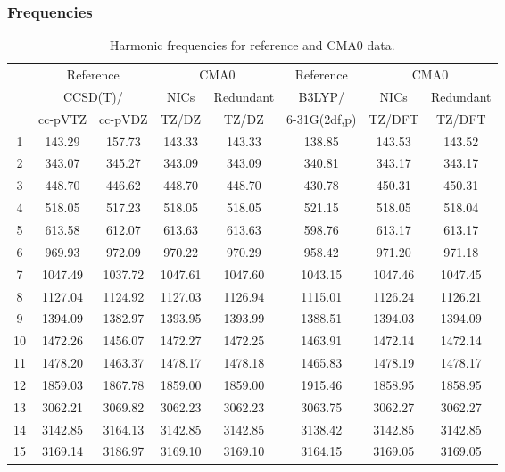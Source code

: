 \documentclass[10pt,oneside]{article}
\begin{document}
\begin{table}[h!]
\subsubsection*{Frequencies}
\centering
\caption{Harmonic frequencies for reference and CMA0 data.}
\begin{tabular}{cccccccc}
\toprule
{} & \multicolumn{2}{c}{Reference} & \multicolumn{2}{c}{CMA0} &    Reference & \multicolumn{2}{c}{CMA0} \\
{} & \multicolumn{2}{c}{CCSD(T)/} &    NICs &  Redundant &       B3LYP/ &    NICs & Redundant \\
{} &   cc-pVTZ & cc-pVDZ &   TZ/DZ &      TZ/DZ & 6-31G(2df,p) &  TZ/DFT &    TZ/DFT \\
\midrule
1  &    143.29 &  157.73 &  143.33 &     143.33 &       138.85 &  143.53 &    143.52 \\
2  &    343.07 &  345.27 &  343.09 &     343.09 &       340.81 &  343.17 &    343.17 \\
3  &    448.70 &  446.62 &  448.70 &     448.70 &       430.78 &  450.31 &    450.31 \\
4  &    518.05 &  517.23 &  518.05 &     518.05 &       521.15 &  518.05 &    518.04 \\
5  &    613.58 &  612.07 &  613.63 &     613.63 &       598.76 &  613.17 &    613.17 \\
6  &    969.93 &  972.09 &  970.22 &     970.29 &       958.42 &  971.20 &    971.18 \\
7  &   1047.49 & 1037.72 & 1047.61 &    1047.60 &      1043.15 & 1047.46 &   1047.45 \\
8  &   1127.04 & 1124.92 & 1127.03 &    1126.94 &      1115.01 & 1126.24 &   1126.21 \\
9  &   1394.09 & 1382.97 & 1393.95 &    1393.99 &      1388.51 & 1394.03 &   1394.09 \\
10 &   1472.26 & 1456.07 & 1472.27 &    1472.25 &      1463.91 & 1472.14 &   1472.14 \\
11 &   1478.20 & 1463.37 & 1478.17 &    1478.18 &      1465.83 & 1478.19 &   1478.17 \\
12 &   1859.03 & 1867.78 & 1859.00 &    1859.00 &      1915.46 & 1858.95 &   1858.95 \\
13 &   3062.21 & 3069.82 & 3062.23 &    3062.23 &      3063.75 & 3062.27 &   3062.27 \\
14 &   3142.85 & 3164.13 & 3142.85 &    3142.85 &      3138.42 & 3142.85 &   3142.85 \\
15 &   3169.14 & 3186.97 & 3169.10 &    3169.10 &      3164.15 & 3169.05 &   3169.05 \\
\bottomrule
\end{tabular}
\end{table}
\end{document}
